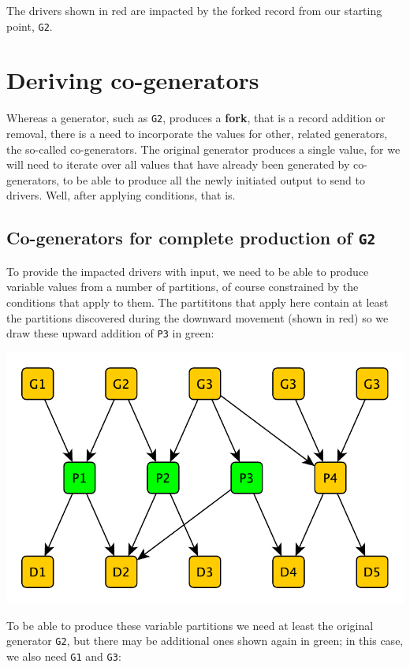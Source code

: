 \documentclass[a4paper]{article}
\def\G#1{\texttt{G#1}\xspace}
\def\P#1{\texttt{P#1}\xspace}
\begin{document}
The drivers shown in red are impacted by the forked record from our starting point, \G2.

\section{Deriving co-generators}

Whereas a generator, such as \G2, produces a \textbf{fork}, that is a record addition or removal, there is a need to incorporate the values for other, related generators, the so-called co-generators.  The original generator produces a single value, for we will need to iterate over all values that have already been generated by co-generators, to be able to produce all the newly initiated output to send to drivers.  Well, after applying conditions, that is.

\subsection{Co-generators for complete production of \G2}

To provide the impacted drivers with input, we need to be able to produce variable values from a number of partitions, of course constrained by the conditions that apply to them.  The partititons that apply here contain at least the partitions discovered during the downward movement (shown in red) so we draw these upward addition of \P3 in green:

\centerline{\includegraphics[scale=0.5]{img/network4-varsneeded.pdf}}

To be able to produce these variable partitions we need at least the original generator \G2, but there may be additional ones shown again in green; in this case, we also need \G1 and \G3:
\end{document}
